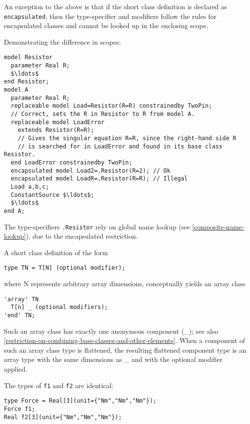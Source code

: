 An exception to the above is that if the short class definition is declared as \lstinline!encapsulated!, then the type-specifier and modifiers follow the rules for encapsulated classes and cannot be looked up in the enclosing scope.

\begin{example}
Demonstrating the difference in scopes:
\begin{lstlisting}[language=modelica]
model Resistor
  parameter Real R;
  $\ldots$
end Resistor;
model A
  parameter Real R;
  replaceable model Load=Resistor(R=R) constrainedby TwoPin;
  // Correct, sets the R in Resistor to R from model A.
  replaceable model LoadError
    extends Resistor(R=R);
    // Gives the singular equation R=R, since the right-hand side R
    // is searched for in LoadError and found in its base class Resistor.
  end LoadError constrainedby TwoPin;
  encapsulated model Load2=.Resistor(R=2); // Ok
  encapsulated model LoadR=.Resistor(R=R); // Illegal
  Load a,b,c;
  ConstantSource $\ldots$;
  $\ldots$
end A;
\end{lstlisting}
The type-specifiers \lstinline!.Resistor! rely on global name lookup (see \ref{composite-name-lookup}), due to the encapsulated restriction.
\end{example}

A short class definition of the form
\begin{lstlisting}[language=modelica]
type TN = T[N] (optional modifier);
\end{lstlisting}
where N represents arbitrary array dimensions, conceptually yields an array class
\begin{lstlisting}[language=modelica]
'array' TN
  T[n] _ (optional modifiers);
'end' TN;
\end{lstlisting}

Such an array class has exactly one anonymous component (\_); see also \cref{restriction-on-combining-base-classes-and-other-elements}.
When a component of such an array class type is flattened, the resulting flattened component type is an array type with the same dimensions as \_ and with the optional modifier applied.

\begin{example}
The types of \lstinline!f1! and \lstinline!f2! are identical:
\begin{lstlisting}[language=modelica]
type Force = Real[3](unit={"Nm","Nm","Nm"});
Force f1;
Real f2[3](unit={"Nm","Nm","Nm"});
\end{lstlisting}
\end{example}

